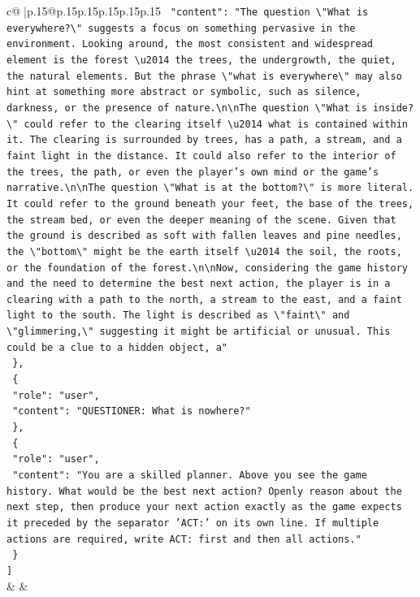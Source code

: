 \documentclass{article}
\begin{document}
{\begin{supertabular}{c@{$\;$}|p{.15\linewidth}@{}p{.15\linewidth}p{.15\linewidth}p{.15\linewidth}p{.15\linewidth}p{.15\linewidth}}
{{{\texttt{    "content": "The question \textbackslash{}"What is everywhere?\textbackslash{}" suggests a focus on something pervasive in the environment. Looking around, the most consistent and widespread element is the forest \textbackslash{}u2014 the trees, the undergrowth, the quiet, the natural elements. But the phrase \textbackslash{}"what is everywhere\textbackslash{}" may also hint at something more abstract or symbolic, such as silence, darkness, or the presence of nature.\textbackslash{}n\textbackslash{}nThe question \textbackslash{}"What is inside?\textbackslash{}" could refer to the clearing itself \textbackslash{}u2014 what is contained within it. The clearing is surrounded by trees, has a path, a stream, and a faint light in the distance. It could also refer to the interior of the trees, the path, or even the player's own mind or the game's narrative.\textbackslash{}n\textbackslash{}nThe question \textbackslash{}"What is at the bottom?\textbackslash{}" is more literal. It could refer to the ground beneath your feet, the base of the trees, the stream bed, or even the deeper meaning of the scene. Given that the ground is described as soft with fallen leaves and pine needles, the \textbackslash{}"bottom\textbackslash{}" might be the earth itself \textbackslash{}u2014 the soil, the roots, or the foundation of the forest.\textbackslash{}n\textbackslash{}nNow, considering the game history and the need to determine the best next action, the player is in a clearing with a path to the north, a stream to the east, and a faint light to the south. The light is described as \textbackslash{}"faint\textbackslash{}" and \textbackslash{}"glimmering,\textbackslash{}" suggesting it might be artificial or unusual. This could be a clue to a hidden object, a"} \\
\texttt{  \},} \\
\texttt{  \{} \\
\texttt{    "role": "user",} \\
\texttt{    "content": "QUESTIONER: What is nowhere?"} \\
\texttt{  \},} \\
\texttt{  \{} \\
\texttt{    "role": "user",} \\
\texttt{    "content": "You are a skilled planner. Above you see the game history. What would be the best next action? Openly reason about the next step, then produce your next action exactly as the game expects it preceded by the separator 'ACT:' on its own line. If multiple actions are required, write ACT: first and then all actions."} \\
\texttt{  \}} \\
\texttt{{]}} \\
            }
        }
    }
    & & \\ \\


\end{supertabular}}
\end{document}
